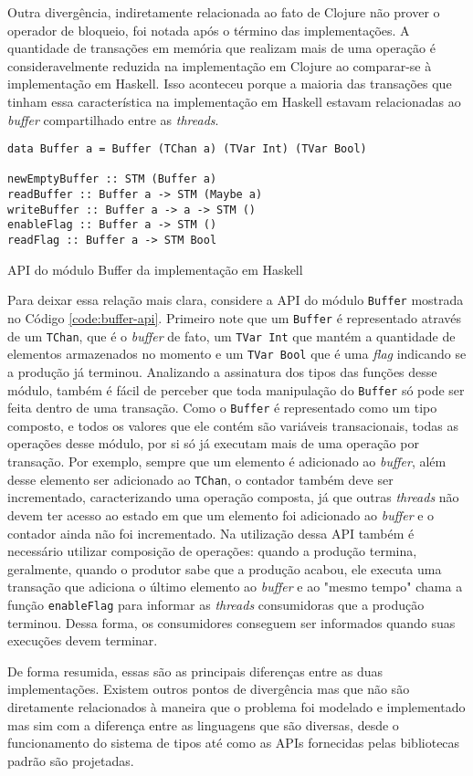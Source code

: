 Outra divergência, indiretamente relacionada ao fato de Clojure não prover o operador de bloqueio, foi notada após o término das implementações. A quantidade de transações em memória que realizam mais de uma operação é consideravelmente reduzida na implementação em Clojure ao comparar-se à implementação em Haskell. Isso aconteceu porque a maioria das transações que tinham essa característica na implementação em Haskell estavam relacionadas ao \emph{buffer} compartilhado entre as \emph{threads}. 

\begin{listing}[h]
  \begin{verbatim}
data Buffer a = Buffer (TChan a) (TVar Int) (TVar Bool)

newEmptyBuffer :: STM (Buffer a)
readBuffer :: Buffer a -> STM (Maybe a)
writeBuffer :: Buffer a -> a -> STM ()
enableFlag :: Buffer a -> STM ()
readFlag :: Buffer a -> STM Bool
  \end{verbatim}
  \caption{API do módulo Buffer da implementação em Haskell}
  \label{code:buffer-api}
\end{listing}

Para deixar essa relação mais clara, considere a API do módulo \verb|Buffer| mostrada no Código \ref{code:buffer-api}. Primeiro note que um \verb|Buffer| é representado através de um \verb|TChan|, que é o \emph{buffer} de fato, um \verb|TVar Int| que mantém a quantidade de elementos armazenados no momento e um \verb|TVar Bool| que é uma \emph{flag} indicando se a produção já terminou. Analizando a assinatura dos tipos das funções desse módulo, também é fácil de perceber que toda manipulação do \verb|Buffer| só pode ser feita dentro de uma transação. Como o \verb|Buffer| é representado como um tipo composto, e todos os valores que ele contém são variáveis transacionais, todas as operações desse módulo, por si só já executam mais de uma operação por transação. Por exemplo, sempre que um elemento é adicionado ao \emph{buffer}, além desse elemento ser adicionado ao \verb|TChan|, o contador também deve ser incrementado, caracterizando uma operação composta, já que outras \emph{threads} não devem ter acesso ao estado em que um elemento foi adicionado ao \emph{buffer} e o contador ainda não foi incrementado. Na utilização dessa API também é necessário utilizar composição de operações: quando a produção termina, geralmente, quando o produtor sabe que a produção acabou, ele executa uma transação que adiciona o último elemento ao \emph{buffer} e ao "mesmo tempo" chama a função \verb|enableFlag| para informar as \emph{threads} consumidoras que a produção terminou. Dessa forma, os consumidores conseguem ser informados quando suas execuções devem terminar.

De forma resumida, essas são as principais diferenças entre as duas implementações. Existem outros pontos de divergência mas que não são diretamente relacionados à maneira que o problema foi modelado e implementado mas sim com a diferença entre as linguagens que são diversas, desde o funcionamento do sistema de tipos até como as APIs fornecidas pelas bibliotecas padrão são projetadas.
